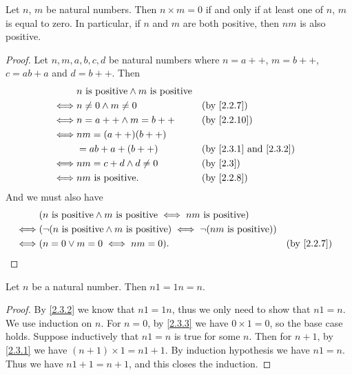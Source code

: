\begin{lem}\label{2.3.3}
  Let \(n\), \(m\) be natural numbers.
  Then \(n \times m = 0\) if and only if at least one of \(n\), \(m\) is equal to zero.
  In particular, if \(n\) and \(m\) are both positive, then \(nm\) is also positive.
\end{lem}

\begin{proof}
  Let \(n, m, a, b, c, d\) be natural numbers where \(n = a++\), \(m = b++\), \(c = ab + a\) and \(d = b++\).
  Then
  \begin{align*}
         & n \text{ is positive} \land m \text{ is positive}                                                \\
    \iff & n \neq 0 \land m \neq 0                           &  & \by{2.2.7}                                \\
    \iff & n = a++ \land m = b++                             &  & \text{(by \cref{2.2.10})}                 \\
    \iff & nm = (a++)(b++)                                                                                  \\
         & = ab + a + (b++)                                  &  & \text{(by \cref{2.3.1} and \cref{2.3.2})} \\
    \iff & nm = c + d \land d \neq 0                         &  & \text{(by \cref{2.3})}                    \\
    \iff & nm \text{ is positive}.                           &  & \by{2.2.8}
  \end{align*}
  And we must also have
  \begin{align*}
         & (n \text{ is positive} \land m \text{ is positive} \iff nm \text{ is positive})                                 \\
    \iff & (\lnot (n \text{ is positive} \land m \text{ is positive}) \iff \lnot (nm \text{ is positive}))                 \\
    \iff & (n = 0 \lor m = 0 \iff nm = 0).                                                                 &  & \by{2.2.7}
  \end{align*}
\end{proof}

\begin{ac}\label{ac:2.3.4}
  Let \(n\) be a natural number.
  Then \(n1 = 1n = n\).
\end{ac}

\begin{proof}
  By \cref{2.3.2} we know that \(n1 = 1n\), thus we only need to show that \(n1 = n\).
  We use induction on \(n\).
  For \(n=0\), by \cref{2.3.3} we have \(0 \times 1 = 0\), so the base case holds.
  Suppose inductively that \(n1 = n\) is true for some \(n\).
  Then for \(n + 1\), by \cref{2.3.1} we have \((n + 1) \times 1 = n1 + 1\).
  By induction hypothesis we have \(n1 = n\).
  Thus we have \(n1 + 1 = n + 1\), and this closes the induction.
\end{proof}

